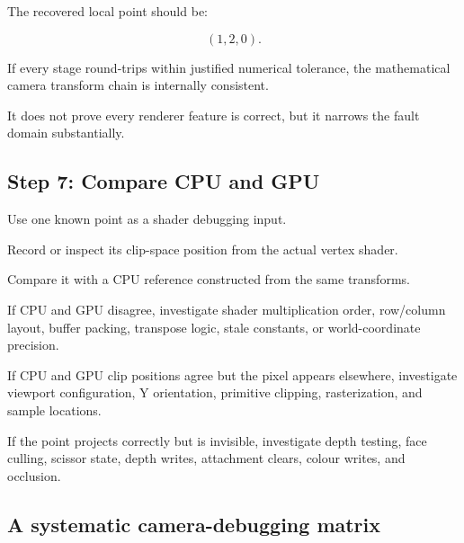 The recovered local point should be:

\[ \boxed{(1,2,0)}. \]

If every stage round-trips within justified numerical tolerance, the mathematical camera transform chain is internally consistent.

It does not prove every renderer feature is correct, but it narrows the fault domain substantially.

\subsection{Step 7: Compare CPU and GPU}\label{02-foundations-ii-ch037-step-7-compare-cpu-and-gpu}

\hypertarget{02-foundations-ii-ch037-step-7-compare-cpu-and-gpu}{}

Use one known point as a shader debugging input.

Record or inspect its clip-space position from the actual vertex shader.

Compare it with a CPU reference constructed from the same transforms.

If CPU and GPU disagree, investigate shader multiplication order, row/column layout, buffer packing, transpose logic, stale constants, or world-coordinate precision.

If CPU and GPU clip positions agree but the pixel appears elsewhere, investigate viewport configuration, Y orientation, primitive clipping, rasterization, and sample locations.

If the point projects correctly but is invisible, investigate depth testing, face culling, scissor state, depth writes, attachment clears, colour writes, and occlusion.

\subsection{A systematic camera-debugging matrix}\label{02-foundations-ii-ch037-a-systematic-camera-debugging-matrix}

\hypertarget{02-foundations-ii-ch037-a-systematic-camera-debugging-matrix}{}


